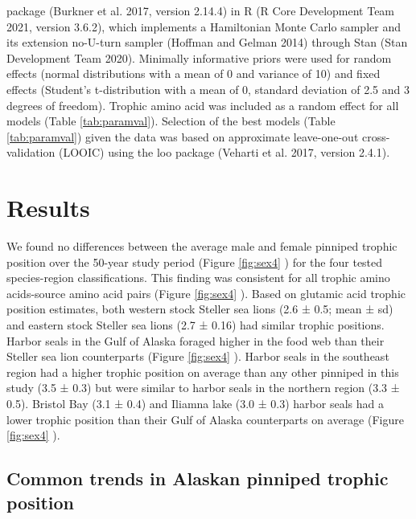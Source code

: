 \documentclass [11pt, proquest] {uwthesis}[2015/03/03]
\begin{document}
package (Burkner et al. 2017, version 2.14.4) in R (R Core Development
Team 2021, version 3.6.2), which implements a Hamiltonian Monte Carlo
sampler and its extension no-U-turn sampler (Hoffman and Gelman 2014)
through Stan (Stan Development Team 2020). Minimally informative priors
were used for random effects (normal distributions with a mean of 0 and
variance of 10) and fixed effects (Student's t-distribution with a mean
of 0, standard deviation of 2.5 and 3 degrees of freedom). Trophic amino
acid was included as a random effect for all models (Table
\ref{tab:paramval}). Selection of the best models (Table
\ref{tab:paramval}) given the data was based on approximate
leave-one-out cross-validation (LOOIC) using the loo package (Veharti et
al. 2017, version 2.4.1).

\section{Results}\label{results-3}

We found no differences between the average male and female pinniped
trophic position over the 50-year study period (Figure \ref{fig:sex4} )
for the four tested species-region classifications. This finding was
consistent for all trophic amino acids-source amino acid pairs (Figure
\ref{fig:sex4} ). Based on glutamic acid trophic position estimates,
both western stock Steller sea lions (2.6 ± 0.5; mean ± sd) and eastern
stock Steller sea lions (2.7 ± 0.16) had similar trophic positions.
Harbor seals in the Gulf of Alaska foraged higher in the food web than
their Steller sea lion counterparts (Figure \ref{fig:sex4} ). Harbor
seals in the southeast region had a higher trophic position on average
than any other pinniped in this study (3.5 ± 0.3) but were similar to
harbor seals in the northern region (3.3 ± 0.5). Bristol Bay (3.1 ± 0.4)
and Iliamna lake (3.0 ± 0.3) harbor seals had a lower trophic position
than their Gulf of Alaska counterparts on average (Figure \ref{fig:sex4}
).

\subsection{Common trends in Alaskan pinniped trophic
position}\label{common-trends-in-alaskan-pinniped-trophic-position}
\end{document}
